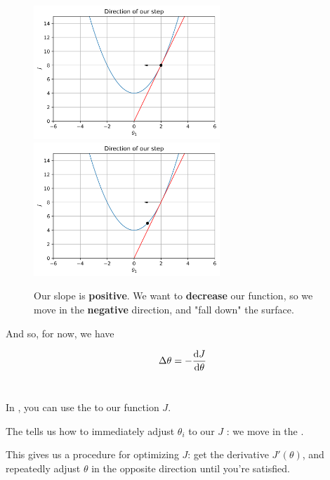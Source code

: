         \begin{figure}[H]
            \includegraphics[width=70mm,scale=0.5]{images/gradient_descent_images/taking_a_step.png}
            \includegraphics[width=70mm,scale=0.5]{images/gradient_descent_images/took_a_step.png}
            
            \caption*{Our slope is \textbf{positive}. We want to \textbf{decrease} our function, so we move in the \textbf{negative} direction, and "fall down" the surface.}
        \end{figure}
        
        And so, for now, we have
        
        \begin{equation}
            \Delta \theta = -\frac{\dd J}{\dd \theta}
        \end{equation}\\
        
        \begin{concept}
            In , you can use the  to  our function $J$.
            
            The  tells us how to immediately adjust $\theta_i$ to  our $J$ : we move in the .
        \end{concept}
        
        This gives us a procedure for optimizing $J$: get the derivative $J'(\theta)$, and repeatedly adjust $\theta$ in the opposite direction until you're satisfied.
        
